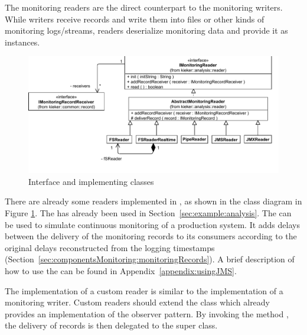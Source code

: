 The monitoring readers are the direct counterpart to the monitoring %
writers. While writers receive records and write them into files or other kinds %
of monitoring logs/streams, readers deserialize monitoring data and provide it as %
 instances. 

\begin{figure}[h]\centering
\includegraphics[scale=0.7]{images/kieker_readerimplsuserguide-modified}
\caption{Interface  and implementing classes}
\label{Figure:ReaderHierarchy}
\end{figure}


% 
% 


\noindent There are already some readers implemented in \Kieker,  as shown in the %
class diagram in Figure \ref{Figure:ReaderHierarchy}. %
The  has already been used in Section~\ref{sec:example:analysis}. %
The  can be used to simulate continuous monitoring of a %
production system. It adds delays between the delivery of the monitoring records %
to its consumers according to the original delays reconstructed from the logging %
timestamps (Section~\ref{sec:componentsMonitoring:monitoringRecords}).
A brief description of how to use the  can be found in Appendix~\ref{appendix:usingJMS}. %

\noindent The implementation of a custom reader is similar to the implementation of a %
monitoring writer. Custom readers should extend the class  %
which already provides an implementation of the observer pattern. %
By invoking the method ,  the delivery of records is then %
delegated to the super class.

